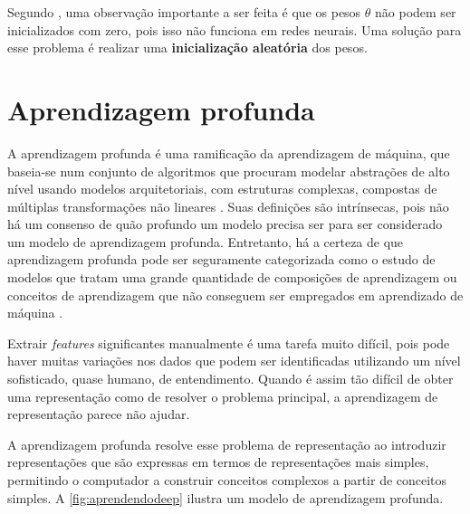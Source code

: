 Segundo \cite{machinelearningcoursera}, uma observação importante a ser feita é que os pesos $\theta$ não podem ser inicializados com zero, pois isso não funciona em redes neurais. Uma solução para esse problema é realizar uma \textbf{inicialização aleatória} dos pesos.












\section{Aprendizagem profunda}

A aprendizagem profunda é uma ramificação da aprendizagem de máquina, que baseia-se num conjunto de algoritmos que procuram modelar abstrações de alto nível usando modelos arquitetoriais, com estruturas complexas, compostas de múltiplas transformações não lineares \cite{deng2014deep}. Suas definições são intrínsecas, pois não há um consenso de quão profundo um modelo precisa ser para ser considerado um modelo de aprendizagem profunda. Entretanto, há a certeza de que aprendizagem profunda pode ser seguramente categorizada como o estudo de modelos que tratam uma grande quantidade de composições de aprendizagem ou conceitos de aprendizagem que não conseguem ser empregados em aprendizado de máquina \cite{Bengio-et-al-2015-Book}. 




Extrair \textit{features} significantes manualmente é uma tarefa muito difícil, pois pode haver muitas variações nos dados que podem ser identificadas utilizando um nível sofisticado, quase humano, de entendimento. Quando é assim tão difícil de obter uma representação como de resolver o problema principal, a aprendizagem de representação parece não ajudar. 

A aprendizagem profunda resolve esse problema de representação ao introduzir representações que são expressas em termos de representações mais simples, permitindo o computador a construir conceitos complexos a partir de conceitos simples. A \autoref{fig:aprendendodeep} ilustra um modelo de aprendizagem profunda.


